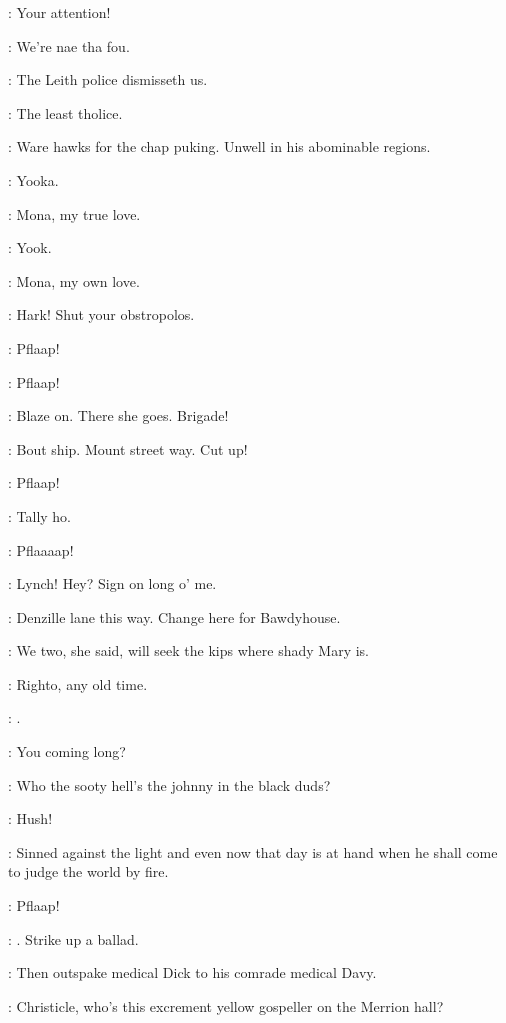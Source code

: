 \documentclass[12pt]{article}
\begin{document}
\Ln: Your attention!

\Cr: We're nae tha fou.

\Ly: The Leith police dismisseth us.

\Ln: The least tholice.

\PC: Ware hawks for the chap puking.
Unwell in his abominable regions.

\SD: Yooka.


\Cr: Mona, my true love.

\Ly: Yook.

\Cr: Mona, my own love.



\Ly: Hark!
Shut your obstropolos.

: Pflaap!

: Pflaap!

\Ln: Blaze on.
There she goes.
Brigade!

\PC: Bout ship.
Mount street way.
Cut up!

: Pflaap!

\Ly: Tally ho.



: Pflaaaap!


\SD: Lynch!
Hey?
Sign on long o' me.

\Ly: Denzille lane this way.
Change here for Bawdyhouse.

\SD: We two, she said, will seek the kips where shady Mary is.

\Ly: Righto, any old time.

\SD: .

\Ly: You coming long?

\SD: Who the sooty hell's the johnny in the black duds?

\Ly: Hush!

\Dw: Sinned against the light and even now that day is at hand
when he shall come to judge the world by fire.

: Pflaap!

\SD: .
Strike up a ballad.

: Then outspake medical Dick to his comrade medical Davy.

\By: Christicle, who's this excrement yellow gospeller on the Merrion hall?
\end{document}
